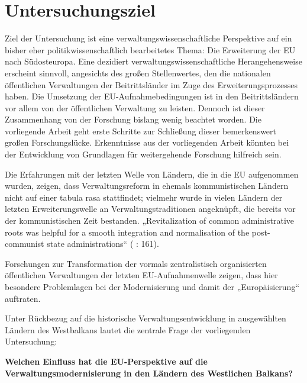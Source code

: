 \section{Untersuchungsziel}
Ziel der Untersuchung ist eine verwaltungswissenschaftliche Perspektive auf ein bisher eher politikwissenschaftlich bearbeitetes Thema: Die Erweiterung der EU nach Südosteuropa. Eine dezidiert verwaltungswissenschaftliche Herangehensweise erscheint sinnvoll, angesichts des großen Stellenwertes, den die nationalen öffentlichen Verwaltungen der Beitrittsländer im Zuge des Erweiterungsprozesses haben. Die Umsetzung der EU-Aufnahmebedingungen ist in den Beitrittsländern vor allem von der öffentlichen Verwaltung zu leisten. Dennoch ist dieser Zusammenhang von der Forschung bislang wenig beachtet worden. Die vorliegende Arbeit geht erste Schritte zur Schließung dieser bemerkenswert großen Forschungslücke. Erkenntnisse aus der vorliegenden Arbeit könnten bei der Entwicklung von Grundlagen für weitergehende Forschung hilfreich sein.\par
Die Erfahrungen mit der letzten Welle von Ländern, die in die EU aufgenommen wurden, zeigen, dass Verwaltungsreform in ehemals kommunistischen Ländern nicht auf einer tabula rasa stattfindet; vielmehr wurde in vielen Ländern der letzten Erweiterungswelle an Verwaltungstraditionen angeknüpft, die bereits vor der kommunistischen Zeit bestanden. „Revitalization of common administrative roots was helpful for a smooth integration and normalisation of the post-communist state administrations“ (\cite{lipumb05} : 161). \par
Forschungen zur Transformation der vormals zentralistisch organisierten öffentlichen Verwaltungen der letzten EU-Aufnahmenwelle zeigen, dass hier besondere Problemlagen bei der Modernisierung und damit der „Europäisierung“ auftraten.\par
Unter Rückbezug auf die historische Verwaltungsentwicklung in ausgewählten Ländern des Westbalkans lautet die zentrale Frage der vorliegenden Untersuchung:\par
{\bf Welchen Einfluss hat die EU-Perspektive auf die Verwaltungsmodernisierung in den Ländern des Westlichen Balkans?}


